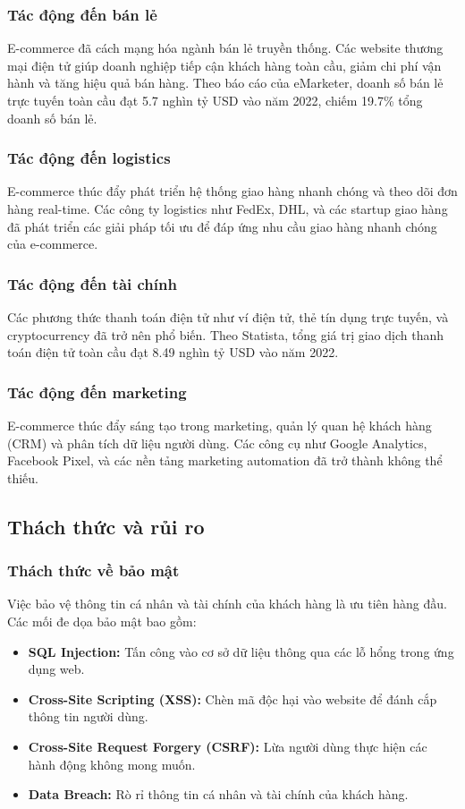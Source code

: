 \documentclass[a4paper,12pt]{report}
\begin{document}
\subsubsection{Tác động đến bán lẻ}
E-commerce đã cách mạng hóa ngành bán lẻ truyền thống. Các website thương mại điện tử giúp doanh nghiệp tiếp cận khách hàng toàn cầu, giảm chi phí vận hành và tăng hiệu quả bán hàng. Theo báo cáo của eMarketer, doanh số bán lẻ trực tuyến toàn cầu đạt 5.7 nghìn tỷ USD vào năm 2022, chiếm 19.7\% tổng doanh số bán lẻ.

\subsubsection{Tác động đến logistics}
E-commerce thúc đẩy phát triển hệ thống giao hàng nhanh chóng và theo dõi đơn hàng real-time. Các công ty logistics như FedEx, DHL, và các startup giao hàng đã phát triển các giải pháp tối ưu để đáp ứng nhu cầu giao hàng nhanh chóng của e-commerce.

\subsubsection{Tác động đến tài chính}
Các phương thức thanh toán điện tử như ví điện tử, thẻ tín dụng trực tuyến, và cryptocurrency đã trở nên phổ biến. Theo Statista, tổng giá trị giao dịch thanh toán điện tử toàn cầu đạt 8.49 nghìn tỷ USD vào năm 2022.

\subsubsection{Tác động đến marketing}
E-commerce thúc đẩy sáng tạo trong marketing, quản lý quan hệ khách hàng (CRM) và phân tích dữ liệu người dùng. Các công cụ như Google Analytics, Facebook Pixel, và các nền tảng marketing automation đã trở thành không thể thiếu.

\subsection{Thách thức và rủi ro}

\subsubsection{Thách thức về bảo mật}
Việc bảo vệ thông tin cá nhân và tài chính của khách hàng là ưu tiên hàng đầu. Các mối đe dọa bảo mật bao gồm:
\begin{itemize}
    \item \textbf{SQL Injection:} Tấn công vào cơ sở dữ liệu thông qua các lỗ hổng trong ứng dụng web.
    \item \textbf{Cross-Site Scripting (XSS):} Chèn mã độc hại vào website để đánh cắp thông tin người dùng.
    \item \textbf{Cross-Site Request Forgery (CSRF):} Lừa người dùng thực hiện các hành động không mong muốn.
    \item \textbf{Data Breach:} Rò rỉ thông tin cá nhân và tài chính của khách hàng.
\end{itemize}
\end{document}
